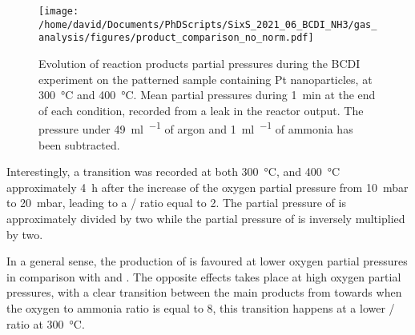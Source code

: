 \begin{figure}[!htb]
    \centering
    \texttt{[image: /home/david/Documents/PhDScripts/SixS\_2021\_06\_BCDI\_NH3/gas\_analysis/figures/product\_comparison\_no\_norm.pdf]}
    \caption{
        Evolution of reaction products partial pressures during the BCDI experiment on the patterned sample containing Pt nanoparticles, at \qty{300}{\degreeCelsius} and \qty{400}{\degreeCelsius}.
        Mean partial pressures during \qty{1}{\minute} at the end of each condition, recorded from a leak in the reactor output.
        The pressure under \qty{49}{\ml\per\min} of argon and \qty{1}{\ml\per\min} of ammonia has been subtracted.
    }
    \label{fig:RGANanoparticlesBCDIComparison}
\end{figure}

Interestingly, a transition was recorded at both \qty{300}{\degreeCelsius}, and \qty{400}{\degreeCelsius} approximately \qty{4}{\hour} after the increase of the oxygen partial pressure from \qty{10}{\milli\bar} to \qty{20}{\milli\bar}, leading to a / ratio equal to 2.
The partial pressure of  is approximately divided by two while the partial pressure of  is inversely multiplied by two.

In a general sense, the production of  is favoured at lower oxygen partial pressures in comparison with  and .
The opposite effects takes place at high oxygen partial pressures, with a clear transition between the main products from  towards  when the oxygen to ammonia ratio is equal to 8, this transition happens at a lower / ratio at \qty{300}{\degreeCelsius}.
